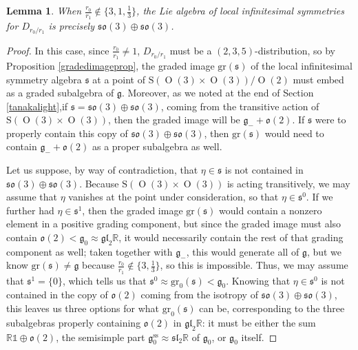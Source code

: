 \documentclass[12pt,a4paper]{amsart}
\newtheorem{lemma}[theorem]{Lemma}
\theoremstyle{definition}
\DeclareMathOperator{\Orth}{O}
\begin{document}
\begin{lemma}When $\tfrac{r_0}{r_1}\!\not\in\!\{3,1,\tfrac{1}{3}\}$, the Lie algebra of local infinitesimal symmetries for $D_{r_0/r_1}$ is precisely $\mathfrak{so}(3)\oplus\mathfrak{so}(3)$.\end{lemma}
\begin{proof}In this case, since $\tfrac{r_0}{r_1}\neq 1$, $D_{r_0/r_1}$ must be a $(2,3,5)$-distribution, so by Proposition \ref{gradedimageprop}, the graded image $\mathrm{gr}(\mathfrak{s})$ of the local infinitesimal symmetry algebra $\mathfrak{s}$ at a point of $\mathrm{S}(\Orth(3)\times\Orth(3))/\Orth(2)$ must embed as a graded subalgebra of $\mathfrak{g}$. Moreover, as we noted at the end of Section \ref{tanakalight},\linebreak if $\mathfrak{s}=\mathfrak{so}(3)\oplus\mathfrak{so}(3)$, coming from the transitive action of $\mathrm{S}(\Orth(3)\times\Orth(3))$, then the graded image will be $\mathfrak{g}_-+\mathfrak{o}(2)$. If $\mathfrak{s}$ were to properly contain this copy of $\mathfrak{so}(3)\oplus\mathfrak{so}(3)$, then $\mathrm{gr}(\mathfrak{s})$ would need to contain $\mathfrak{g}_-+\mathfrak{o}(2)$ as a proper subalgebra as well.

Let us suppose, by way of contradiction, that $\eta\in\mathfrak{s}$ is not contained in $\mathfrak{so}(3)\oplus\mathfrak{so}(3)$. Because $\mathrm{S}(\Orth(3)\times\Orth(3))$ is acting transitively, we may assume that $\eta$ vanishes at the point under consideration, so that $\eta\in\mathfrak{s}^0$. If we further had $\eta\in\mathfrak{s}^1$, then the graded image $\mathrm{gr}(\mathfrak{s})$ would contain a nonzero element in a positive grading component, but since the graded image must also contain $\mathfrak{o}(2)<\mathfrak{g}_0\approx\mathfrak{gl}_2\mathbb{R}$, it would necessarily contain the rest of that grading component as well; taken together with $\mathfrak{g}_-$, this would generate all of $\mathfrak{g}$, but we know $\mathrm{gr}(\mathfrak{s})\neq\mathfrak{g}$ because $\tfrac{r_0}{r_1}\not\in\{3,\tfrac{1}{3}\}$, so this is impossible. Thus, we may assume that $\mathfrak{s}^1=\{0\}$, which tells us that $\mathfrak{s}^0\approx\mathrm{gr}_0(\mathfrak{s})<\mathfrak{g}_0$. Knowing that $\eta\in\mathfrak{s}^0$ is not contained in the copy of $\mathfrak{o}(2)$ coming from the isotropy of $\mathfrak{so}(3)\oplus\mathfrak{so}(3)$, this leaves us three options for what $\mathrm{gr}_0(\mathfrak{s})$ can be, corresponding to the three subalgebras properly containing $\mathfrak{o}(2)$ in $\mathfrak{gl}_2\mathbb{R}$: it must be either the sum $\mathbb{R}\mathds{1}\oplus\mathfrak{o}(2)$, the semisimple part $\mathfrak{g}_0^\text{ss}\approx\mathfrak{sl}_2\mathbb{R}$ of $\mathfrak{g}_0$, or $\mathfrak{g}_0$ itself.


\end{proof}
\end{document}
